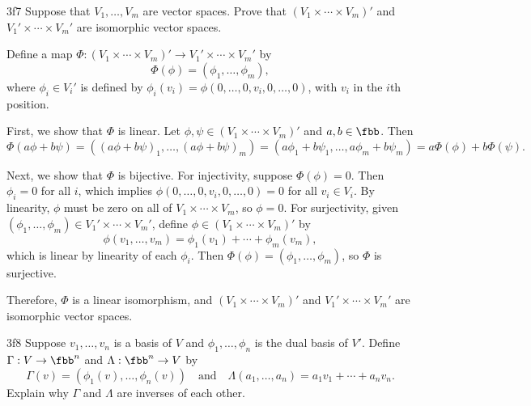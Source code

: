 \begin{exercise}{3f7}
    Suppose that $V_1, \ldots, V_m$ are vector spaces.
	Prove that $(V_1 \times \cdots \times V_m)'$ and $V_1' \times \cdots \times V_m'$ are isomorphic vector spaces.
\end{exercise}

\begin{sol}
    Define a map $\Phi: (V_1 \times \cdots \times V_m)' \to V_1' \times \cdots \times V_m'$ by
    \[
    	\Phi(\phi) = (\phi_1, \ldots, \phi_m),
    \]
    where $\phi_i \in V_i'$ is defined by $\phi_i(v_i) = \phi(0, \ldots, 0, v_i, 0, \ldots, 0)$, with $v_i$ in the $i$th position. 

    First, we show that $\Phi$ is linear.
	Let $\phi, \psi \in (V_1 \times \cdots \times V_m)'$ and $a, b \in \fbb$.
	Then
    \[
    	\Phi(a\phi + b\psi) = ((a\phi + b\psi)_1, \ldots, (a\phi + b\psi)_m) = (a\phi_1 + b\psi_1, \ldots, a\phi_m + b\psi_m) = a\Phi(\phi) + b\Phi(\psi).
    \]

    Next, we show that $\Phi$ is bijective.
	For injectivity, suppose $\Phi(\phi) = 0$.
	Then $\phi_i = 0$ for all $i$, which implies $\phi(0, \ldots, 0, v_i, 0, \ldots, 0) = 0$ for all $v_i \in V_i$.
	By linearity, $\phi$ must be zero on all of $V_1 \times \cdots \times V_m$, so $\phi = 0$.
	For surjectivity, given $(\phi_1, \ldots, \phi_m) \in V_1' \times \cdots \times V_m'$, define $\phi \in (V_1 \times \cdots \times V_m)'$ by
    \[
    	\phi(v_1, \ldots, v_m) = \phi_1(v_1) + \cdots + \phi_m(v_m),
    \]
    which is linear by linearity of each $\phi_i$. Then $\Phi(\phi) = (\phi_1, \ldots, \phi_m)$, so $\Phi$ is surjective.

    Therefore, $\Phi$ is a linear isomorphism, and $(V_1 \times \cdots \times V_m)'$ and $V_1' \times \cdots \times V_m'$ are isomorphic vector spaces.
\end{sol}

\begin{exercise}{3f8}
    Suppose $v_1, \ldots, v_n$ is a basis of $V$ and $\phi_1, \ldots, \phi_n$ is the dual basis of $V'$.
	Define $\Gamma: V \to \fbb^n$ and $\Lambda: \fbb^n \to V$ by
    \[
    	\Gamma(v) = (\phi_1(v), \ldots, \phi_n(v)) \quad \text{and} \quad \Lambda(a_1, \ldots, a_n) = a_1 v_1 + \cdots + a_n v_n.
    \]
    Explain why $\Gamma$ and $\Lambda$ are inverses of each other.
\end{exercise}

